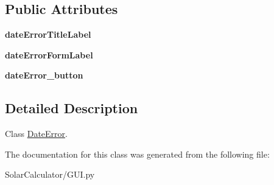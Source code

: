 \subsection*{Public Attributes}
\begin{DoxyCompactItemize}
\item 
\hypertarget{class_solar_calculator_1_1_g_u_i_1_1_date_error_a2831a2d98cdf15230a4db6ca82af9bed}{{\bfseries date\-Error\-Title\-Label}}\label{class_solar_calculator_1_1_g_u_i_1_1_date_error_a2831a2d98cdf15230a4db6ca82af9bed}

\item 
\hypertarget{class_solar_calculator_1_1_g_u_i_1_1_date_error_aedc22b90322ec6523b618c00634919b2}{{\bfseries date\-Error\-Form\-Label}}\label{class_solar_calculator_1_1_g_u_i_1_1_date_error_aedc22b90322ec6523b618c00634919b2}

\item 
\hypertarget{class_solar_calculator_1_1_g_u_i_1_1_date_error_afca5e97afd7e6c4b3e4f126e67b81650}{{\bfseries date\-Error\-\_\-button}}\label{class_solar_calculator_1_1_g_u_i_1_1_date_error_afca5e97afd7e6c4b3e4f126e67b81650}

\end{DoxyCompactItemize}


\subsection{Detailed Description}
Class \hyperlink{class_solar_calculator_1_1_g_u_i_1_1_date_error}{Date\-Error}. 

The documentation for this class was generated from the following file\-:\begin{DoxyCompactItemize}
\item 
Solar\-Calculator/G\-U\-I.\-py\end{DoxyCompactItemize}
